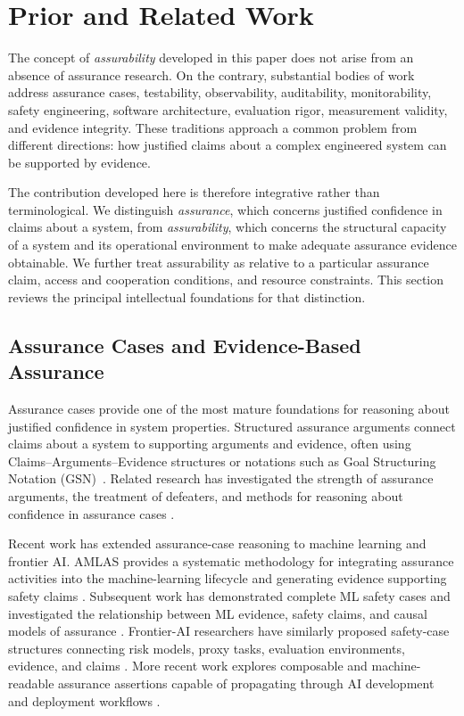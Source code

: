 \section{Prior and Related Work}
\label{aa.sec.prior-work}

The concept of \emph{assurability} developed in this paper does not arise from an absence of assurance research.
On the contrary, substantial bodies of work address assurance cases, testability, observability, auditability,
monitorability, safety engineering, software architecture, evaluation rigor, measurement validity, and evidence integrity.
These traditions approach a common problem from different directions: how justified claims about a complex engineered system can be supported by evidence.

The contribution developed here is therefore integrative rather than terminological.
We distinguish \emph{assurance}, which concerns justified confidence in claims about a system, from \emph{assurability},
which concerns the structural capacity of a system and its operational environment to make adequate assurance evidence obtainable.
We further treat assurability as relative to a particular assurance claim, access and cooperation conditions, and resource constraints.
This section reviews the principal intellectual foundations for that distinction.

\subsection{Assurance Cases and Evidence-Based Assurance}

Assurance cases provide one of the most mature foundations for reasoning about justified confidence in system properties.
Structured assurance arguments connect claims about a system to supporting arguments and evidence, often using
Claims--Arguments--Evidence structures or notations such as
Goal Structuring Notation (GSN)~\cite{bloomfield2010safetycases, nistAssuranceCase}.
Related research has investigated the strength of assurance arguments, the treatment of defeaters,
and methods for reasoning about confidence in assurance cases \cite{graydon2017confidence}.

Recent work has extended assurance-case reasoning to machine learning and frontier AI.
AMLAS provides a systematic methodology for integrating assurance activities into the
machine-learning lifecycle and generating evidence supporting safety claims \cite{hawkins2021amlas}.
Subsequent work has demonstrated complete ML safety cases and investigated the relationship between ML evidence, safety claims,
and causal models of assurance \cite{picardi2023mlsafetycase, burton2022causalmodelsafetyassurance}.
Frontier-AI researchers have similarly proposed
safety-case structures connecting risk models, proxy tasks, evaluation environments,
evidence, and claims \cite{goemans2024frontiercases}.
More recent work explores composable and
machine-readable assurance assertions capable of propagating through AI development and
deployment workflows \cite{zhao2026composableassurance}.

